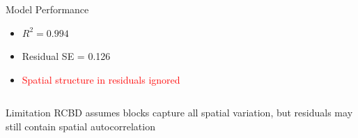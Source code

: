 \documentclass[aspectratio=43]{beamer}
\begin{document}
\begin{frame}
\begin{columns}[T]
\begin{column}{0.5\textwidth}
            \begin{block}{Model Performance}
                \begin{itemize}
                    \item $R^2 = 0.994$
                    \item Residual SE = 0.126
                    \item \textcolor{red}{Spatial structure in residuals ignored}
                \end{itemize}
            \end{block}
        \end{column}
    \end{columns}
    
    \vspace{1em}
    
    \begin{alertblock}{Limitation}
        RCBD assumes blocks capture all spatial variation, but residuals may still contain spatial autocorrelation
    \end{alertblock}
\end{frame}
\end{document}
